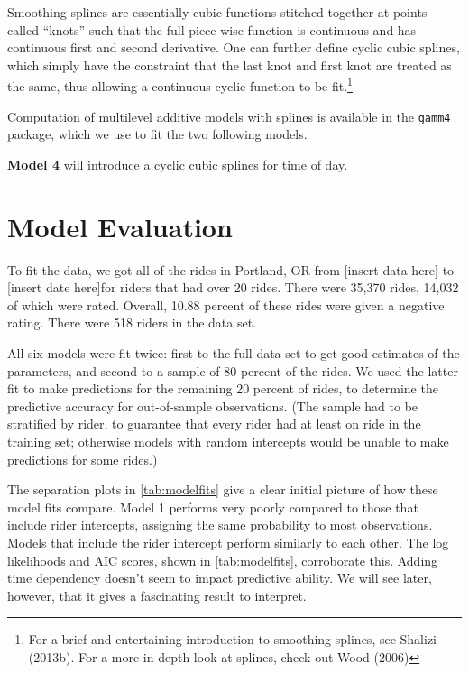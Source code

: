 \documentclass[12pt,twoside]{reedthesis}
\begin{document}
  Smoothing splines are essentially cubic functions stitched together at
  points called ``knots'' such that the full piece-wise function is
  continuous and has continuous first and second derivative. One can
  further define cyclic cubic splines, which simply have the constraint
  that the last knot and first knot are treated as the same, thus allowing
  a continuous cyclic function to be fit.\footnote{For a brief and
    entertaining introduction to smoothing splines, see Shalizi (2013b).
    For a more in-depth look at splines, check out Wood (2006)}
  
  Computation of multilevel additive models with splines is available in
  the \texttt{gamm4} package, which we use to fit the two following
  models.
  
  \textbf{Model 4} will introduce a cyclic cubic splines for time of day.
  
  \section{Model Evaluation}\label{model-evaluation}
  
  To fit the data, we got all of the rides in Portland, OR from {[}insert
  data here{]} to {[}insert date here{]}for riders that had over 20 rides.
  There were 35,370 rides, 14,032 of which were rated. Overall, 10.88
  percent of these rides were given a negative rating. There were 518
  riders in the data set.
  
  All six models were fit twice: first to the full data set to get good
  estimates of the parameters, and second to a sample of 80 percent of the
  rides. We used the latter fit to make predictions for the remaining 20
  percent of rides, to determine the predictive accuracy for out-of-sample
  observations. (The sample had to be stratified by rider, to guarantee
  that every rider had at least on ride in the training set; otherwise
  models with random intercepts would be unable to make predictions for
  some rides.)
  
  The separation plots in \autoref{tab:modelfits} give a clear initial
  picture of how these model fits compare. Model 1 performs very poorly
  compared to those that include rider intercepts, assigning the same
  probability to most observations. Models that include the rider
  intercept perform similarly to each other. The log likelihoods and AIC
  scores, shown in \autoref{tab:modelfits}, corroborate this. Adding time
  dependency doesn't seem to impact predictive ability. We will see later,
  however, that it gives a fascinating result to interpret.
  
\end{document}

